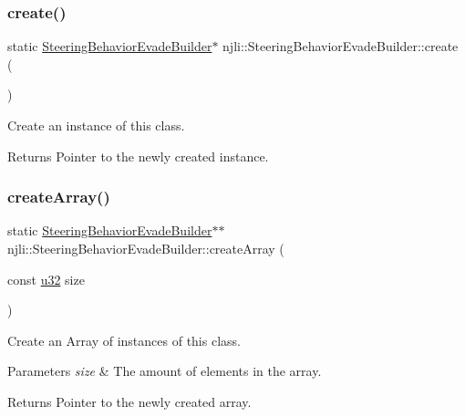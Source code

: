 \subsubsection{\texorpdfstring{create()}{create()}}
{\footnotesize\ttfamily static \mbox{\hyperlink{classnjli_1_1_steering_behavior_evade_builder}{Steering\+Behavior\+Evade\+Builder}}$\ast$ njli\+::\+Steering\+Behavior\+Evade\+Builder\+::create (\begin{DoxyParamCaption}{ }\end{DoxyParamCaption})\hspace{0.3cm}{\ttfamily [static]}}

Create an instance of this class.

\begin{DoxyReturn}{Returns}
Pointer to the newly created instance. 
\end{DoxyReturn}
\mbox{\label{classnjli_1_1_steering_behavior_evade_builder_af6700d938518bb5051c0d972d164f53a}} 
\subsubsection{\texorpdfstring{create\+Array()}{createArray()}}
{\footnotesize\ttfamily static \mbox{\hyperlink{classnjli_1_1_steering_behavior_evade_builder}{Steering\+Behavior\+Evade\+Builder}}$\ast$$\ast$ njli\+::\+Steering\+Behavior\+Evade\+Builder\+::create\+Array (\begin{DoxyParamCaption}\item[{const \mbox{\hyperlink{_util_8h_a10e94b422ef0c20dcdec20d31a1f5049}{u32}}}]{size }\end{DoxyParamCaption})\hspace{0.3cm}{\ttfamily [static]}}

Create an Array of instances of this class.


\begin{DoxyParams}{Parameters}
{\em size} & The amount of elements in the array.\\
\hline
\end{DoxyParams}
\begin{DoxyReturn}{Returns}
Pointer to the newly created array. 
\end{DoxyReturn}
\mbox{\label{classnjli_1_1_steering_behavior_evade_builder_af99d88947146d4aaf51e279760d327b2}} 
